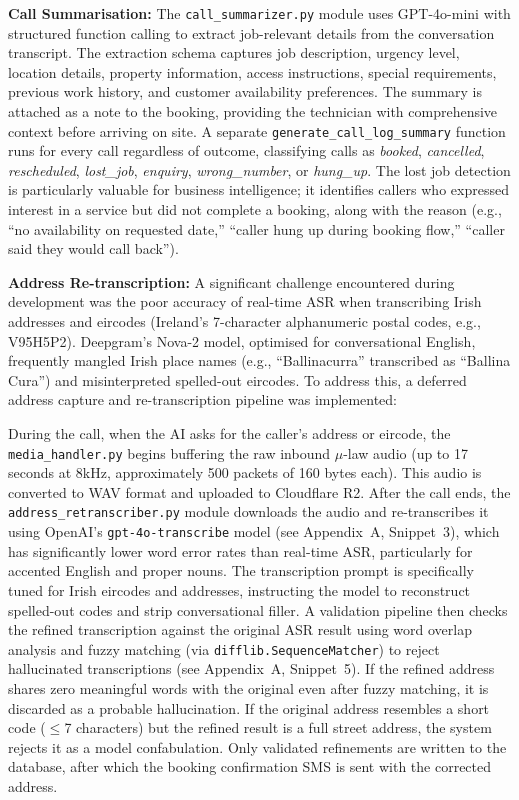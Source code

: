 \documentclass[conference]{IEEEtran}
\begin{document}
\textbf{Call Summarisation:} The \texttt{call\_summarizer.py} module uses GPT-4o-mini with structured function calling to extract job-relevant details from the conversation transcript. The extraction schema captures job description, urgency level, location details, property information, access instructions, special requirements, previous work history, and customer availability preferences. The summary is attached as a note to the booking, providing the technician with comprehensive context before arriving on site. A separate \texttt{generate\_call\_log\_summary} function runs for every call regardless of outcome, classifying calls as \textit{booked}, \textit{cancelled}, \textit{rescheduled}, \textit{lost\_job}, \textit{enquiry}, \textit{wrong\_number}, or \textit{hung\_up}. The lost job detection is particularly valuable for business intelligence; it identifies callers who expressed interest in a service but did not complete a booking, along with the reason (e.g., ``no availability on requested date,'' ``caller hung up during booking flow,'' ``caller said they would call back'').

\textbf{Address Re-transcription:} A significant challenge encountered during development was the poor accuracy of real-time ASR when transcribing Irish addresses and eircodes (Ireland's 7-character alphanumeric postal codes, e.g., V95H5P2). Deepgram's Nova-2 model, optimised for conversational English, frequently mangled Irish place names (e.g., ``Ballinacurra'' transcribed as ``Ballina Cura'') and misinterpreted spelled-out eircodes. To address this, a deferred address capture and re-transcription pipeline was implemented:

During the call, when the AI asks for the caller's address or eircode, the \texttt{media\_handler.py} begins buffering the raw inbound $\mu$-law audio (up to 17 seconds at 8kHz, approximately 500 packets of 160 bytes each). This audio is converted to WAV format and uploaded to Cloudflare R2. After the call ends, the \texttt{address\_retranscriber.py} module downloads the audio and re-transcribes it using OpenAI's \texttt{gpt-4o-transcribe} model (see Appendix~A, Snippet~3), which has significantly lower word error rates than real-time ASR, particularly for accented English and proper nouns. The transcription prompt is specifically tuned for Irish eircodes and addresses, instructing the model to reconstruct spelled-out codes and strip conversational filler. A validation pipeline then checks the refined transcription against the original ASR result using word overlap analysis and fuzzy matching (via \texttt{difflib.SequenceMatcher}) to reject hallucinated transcriptions (see Appendix~A, Snippet~5). If the refined address shares zero meaningful words with the original even after fuzzy matching, it is discarded as a probable hallucination. If the original address resembles a short code ($\leq$7 characters) but the refined result is a full street address, the system rejects it as a model confabulation. Only validated refinements are written to the database, after which the booking confirmation SMS is sent with the corrected address.
\end{document}
